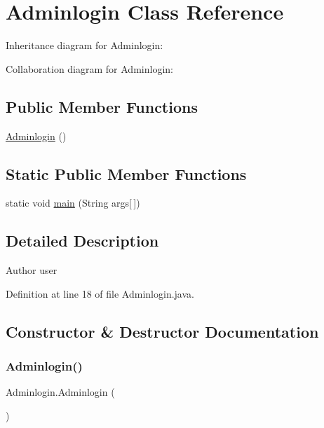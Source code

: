 \hypertarget{class_adminlogin}{}\section{Adminlogin Class Reference}
\label{class_adminlogin}


Inheritance diagram for Adminlogin\+:


Collaboration diagram for Adminlogin\+:
\subsection*{Public Member Functions}
\begin{DoxyCompactItemize}
\item 
\mbox{\hyperlink{class_adminlogin_add0f79e932c5b125b83627105b615b7c}{Adminlogin}} ()
\end{DoxyCompactItemize}
\subsection*{Static Public Member Functions}
\begin{DoxyCompactItemize}
\item 
static void \mbox{\hyperlink{class_adminlogin_a774eb850258e0061dd7871daa7fceb8b}{main}} (String args\mbox{[}$\,$\mbox{]})
\end{DoxyCompactItemize}


\subsection{Detailed Description}
\begin{DoxyAuthor}{Author}
user 
\end{DoxyAuthor}


Definition at line 18 of file Adminlogin.\+java.



\subsection{Constructor \& Destructor Documentation}
\mbox{\label{class_adminlogin_add0f79e932c5b125b83627105b615b7c}} 
\subsubsection{\texorpdfstring{Adminlogin()}{Adminlogin()}}
{\footnotesize\ttfamily Adminlogin.\+Adminlogin (\begin{DoxyParamCaption}{ }\end{DoxyParamCaption})}


